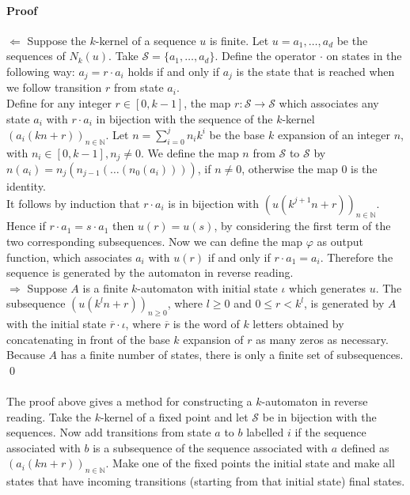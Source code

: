 \documentclass{article}
\begin{document}
\paragraph{Proof}
$\Leftarrow$ Suppose the $k$-kernel of a sequence $u$ is finite. Let
$u = a_1, \ldots, a_d$ be the sequences of $N_k(u)$. Take
$\mathcal{S} = \{a_1, \ldots, a_d\}$. Define the operator $\cdot$ on states in 
the following way: $a_j = r \cdot a_i$ holds if and only if $a_j$ is the 
state that is reached when we follow transition $r$ from state $a_i$.\\
Define for any integer $r \in [0, k - 1]$, the map 
$r : \mathcal{S} \rightarrow \mathcal{S}$ which associates any state 
$a_i$ with $r \cdot a_i$ in bijection with the sequence of the $k$-kernel
$(a_i(kn + r))_{n \in \mathbb{N}}$. Let $n = \sum_{i = 0}^j n_i k^i$ be the 
base $k$ expansion of an integer $n$, with $n_i \in [0, k - 1], n_j \ne 0$.  
We define the map $n$ from
$\mathcal{S}$ to $\mathcal{S}$ by $n(a_i) = n_j(n_{j - 1}( \ldots (n_0(a_i))))$,
if $n \ne 0$, otherwise the map 0 is the identity.\\
It follows by induction that $r \cdot a_i$ is in bijection with
$(u(k^{j + 1} n + r))_{n \in \mathbb{N}}$. Hence if $r \cdot a_1 = s \cdot a_1$
then $u(r) = u(s)$, by considering the first term of the two corresponding
subsequences. Now we can define the map $\varphi$ as output function, which
associates $a_i$ with $u(r)$ if and only if $r \cdot a_1 = a_i$. Therefore the
sequence is generated by the automaton in reverse reading.\\
$\Rightarrow$ Suppose $A$ is a finite $k$-automaton with initial state $\iota$
which generates $u$. The subsequence $(u(k^ln + r))_{n \ge 0}$, where
$l \ge 0$ and $0 \le r < k^l$, is generated by $A$ with the initial state
$\overline{r} \cdot \iota$, where $\overline{r}$ is the word of $k$ letters
obtained by concatenating in front of the base $k$ expansion of $r$ as many
zeros as necessary. Because $A$ has a finite number of states, there is only a
finite set of subsequences. \qed\\
\\
The proof above gives a method for constructing a $k$-automaton in reverse
reading. Take the $k$-kernel of a fixed point and let $\mathcal{S}$ be in
bijection with the sequences. Now add transitions from state $a$ to $b$
labelled $i$ if the sequence associated with $b$ is a subsequence of the
sequence associated with $a$ defined as $(a_i(kn + r))_{n \in \mathbb{N}}$.
Make one of the fixed points the initial state and make all states that have
incoming transitions (starting from that initial state) final states.
\end{document}
